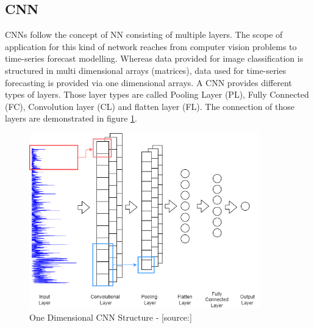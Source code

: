 \subsection{CNN}
\label{sec:cnn}
CNNs follow the concept of NN consisting of multiple layers. The scope of application for this kind of network reaches from computer vision problems to time-series forecast modelling. Whereas data provided for image classification is structured in multi dimensional arrays (matrices), data used for time-series forecasting is provided via one dimensional arrays.\cite{cnn_intro} A CNN provides different types of layers. Those layer types are called Pooling Layer (PL), Fully Connected (FC), Convolution layer (CL) and flatten layer (FL). The connection of those layers are demonstrated in figure \ref{fig:cnn_struct}.
\begin{figure}[H]
	\centering
		\includegraphics[width=10cm]{images/1d_cnn_model}
	\caption{One Dimensional CNN Structure - [source:\cite{cnn_vechicle}]}
	\label{fig:cnn_struct}
\end{figure}

